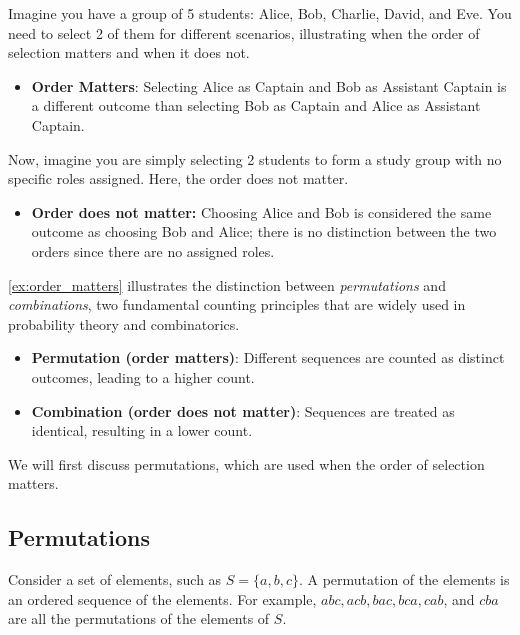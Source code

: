 \begin{example}
    Imagine you have a group of 5 students: Alice, Bob, Charlie, David, and Eve. You need to select 2 of them for different scenarios, illustrating when the order of selection matters and when it does not.
    \begin{itemize}
        \item \textbf{Order Matters}: Selecting Alice as Captain and Bob as Assistant Captain is a different outcome than selecting Bob as Captain and Alice as Assistant Captain.
        \end{itemize}
    Now, imagine you are simply selecting 2 students to form a study group with no specific roles assigned. Here, the order does not matter.
    \begin{itemize}
        \item \textbf{Order does not matter:}  Choosing Alice and Bob is considered the same outcome as choosing Bob and Alice; there is no distinction between the two orders since there are no assigned roles.
    \end{itemize}
    \label{ex:order_matters}
\end{example}

\autoref{ex:order_matters} illustrates the distinction between \textit{permutations} and \textit{combinations}, two fundamental counting principles that are widely used in probability theory and combinatorics.

\begin{definition}
    \begin{itemize}
        \item \textbf{Permutation (order matters)}: Different sequences are counted as distinct outcomes, leading to a higher count.
        \item \textbf{Combination (order does not matter)}: Sequences are treated as identical, resulting in a lower count.
    \end{itemize}
\end{definition}

We will first discuss permutations, which are used when the order of selection matters.

\subsection*{Permutations}

Consider a set of elements, such as $S=\{a, b, c\}$. A permutation of the elements is an ordered sequence of the elements. For example, $a b c, a c b, b a c, b c a, c a b$, and $c b a$ are all the permutations of the elements of $S$.

